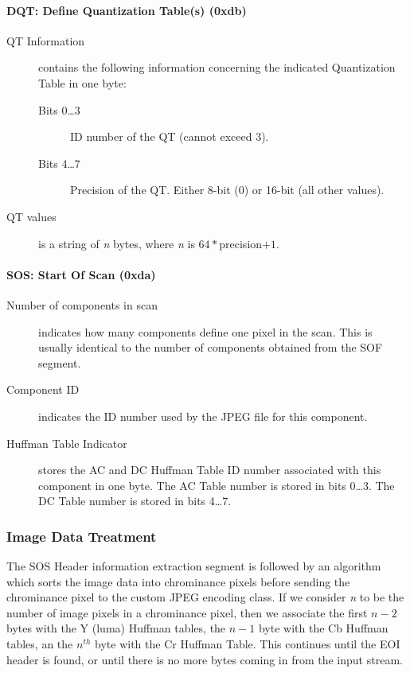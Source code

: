 \paragraph*{DQT: Define Quantization Table(s) (0xdb)}
\begin{description}
	\item[QT Information] contains the following information concerning the indicated Quantization Table in one byte:
		\begin{description}
			\item[Bits 0\ldots3] ID number of the QT (cannot exceed 3).
			\item[Bits 4\ldots7] Precision of the QT. Either 8-bit (0) or 16-bit (all other values).
		\end{description}
	\item[QT values] is a string of \emph{n} bytes, where \emph{n} is $64*$precision$+1$.
\end{description}

\paragraph*{SOS: Start Of Scan (0xda)}
\begin{description}
	\item[Number of components in scan] indicates how many components define one pixel in the scan. 
		This is usually identical to  the number of components obtained from the SOF segment.
	\item[Component ID] indicates the ID number used by the JPEG file for this component.\footnotemark[1] 
	\item[Huffman Table Indicator] stores the AC and DC Huffman Table ID number associated with this component in one byte. 
		The AC Table number is stored in bits 0\ldots3. The DC Table number is stored in bits 4\ldots7.\footnotemark[1]
\end{description}

\subsubsection{Image Data Treatment}

The SOS Header information extraction segment is followed by an algorithm which 
sorts the image data into chrominance pixels before sending the chrominance pixel to the custom JPEG encoding class. 
If we consider \emph{n} to be the number of image pixels in a chrominance pixel, then 
we associate the first $n - 2$ bytes with the Y (luma) Huffman tables, the $n - 1$ byte with the Cb Huffman tables, 
an the $n^{th}$ byte with the Cr Huffman Table. 
This continues until the EOI header is found, or until there is no more bytes coming in from the input stream.
